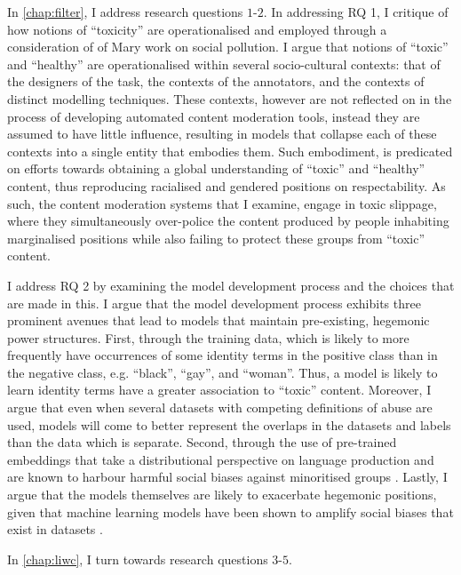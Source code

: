 In \cref{chap:filter}, I address research questions $1$-$2$.
In addressing RQ 1, I critique of how notions of ``toxicity'' are operationalised and employed through a consideration of of Mary \citet{Douglas:1966} work on social pollution.
I argue that notions of ``toxic'' and ``healthy'' are operationalised within several socio-cultural contexts: that of the designers of the task, the contexts of the annotators, and the contexts of distinct modelling techniques.
These contexts, however are not reflected on in the process of developing automated content moderation tools, instead they are assumed to have little influence, resulting in models that collapse each of these contexts into a single entity that embodies them.
Such embodiment, is predicated on efforts towards obtaining a global understanding of ``toxic'' and ``healthy'' content, thus reproducing racialised and gendered positions on respectability.
As such, the content moderation systems that I examine, engage in toxic slippage, where they simultaneously over-police the content produced by people inhabiting marginalised positions while also failing to protect these groups from ``toxic'' content.

I address RQ 2 by examining the model development process and the choices that are made in this.
I argue that the model development process exhibits three prominent avenues that lead to models that maintain pre-existing, hegemonic power structures.
First, through the training data, which is likely to more frequently have occurrences of some identity terms in the positive class than in the negative class, e.g. ``black'', ``gay'', and ``woman''.
Thus, a model is likely to learn identity terms have a greater association to ``toxic'' content.
Moreover, I argue that even when several datasets with competing definitions of abuse are used, models will come to better represent the overlaps in the datasets and labels than the data which is separate.
Second, through the use of pre-trained embeddings that take a distributional perspective on language production and are known to harbour harmful social biases against minoritised groups \citep{Speer:2017}.
Lastly, I argue that the models themselves are likely to exacerbate hegemonic positions, given that machine learning models have been shown to amplify social biases that exist in datasets \citep{Zhao:2017}.

In \cref{chap:liwc}, I turn towards research questions $3$-$5$.


